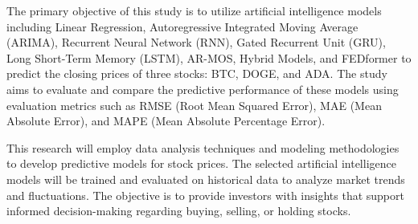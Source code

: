 \documentclass{ieeeojies}
\begin{document}
The primary objective of this study is to utilize artificial intelligence models including Linear Regression, Autoregressive Integrated Moving Average (ARIMA), Recurrent Neural Network (RNN), Gated Recurrent Unit (GRU), Long Short-Term Memory (LSTM), AR-MOS, Hybrid Models, and FEDformer to predict the closing prices of three stocks: BTC, DOGE, and ADA. The study aims to evaluate and compare the predictive performance of these models using evaluation metrics such as RMSE (Root Mean Squared Error), MAE (Mean Absolute Error), and MAPE (Mean Absolute Percentage Error).

This research will employ data analysis techniques and modeling methodologies to develop predictive models for stock prices. The selected artificial intelligence models will be trained and evaluated on historical data to analyze market trends and fluctuations. The objective is to provide investors with insights that support informed decision-making regarding buying, selling, or holding stocks.
\end{document}
